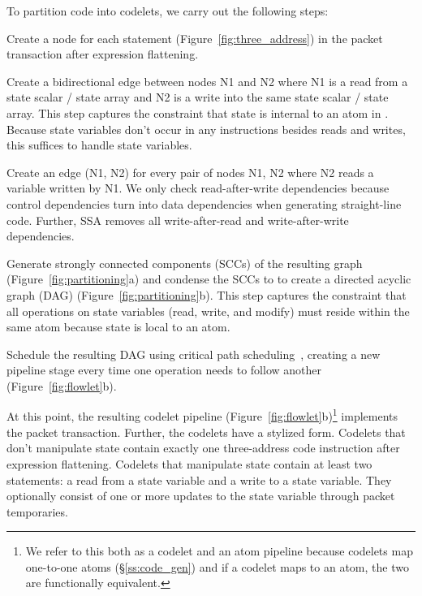 To partition code into codelets, we carry out the following steps:
\begin{CompactEnumerate}
  \item Create a node for each statement (Figure~\ref{fig:three_address}) in
    the packet transaction after expression flattening.
  \item Create a bidirectional edge between nodes N1 and N2 where N1 is a read from a
    state scalar / state array and N2 is a write into the same state scalar /
    state array. This step captures the constraint that state is internal to an
    atom in \absmachine. Because state variables don't occur in any
    instructions besides reads and writes, this suffices to handle state variables.
  \item Create an edge (N1, N2) for every pair of nodes N1, N2 where N2 reads
    a variable written by N1. We only check read-after-write dependencies because
    control dependencies turn into data dependencies when generating straight-line
    code. Further, SSA removes all write-after-read and write-after-write dependencies.
  \item Generate strongly connected components (SCCs) of the resulting graph
    (Figure~\ref{fig:partitioning}a) and condense the SCCs to to create a directed
    acyclic graph (DAG) (Figure~\ref{fig:partitioning}b). This step captures the
    constraint that all operations on state variables (read, write, and modify)
    must reside within the same atom because state is local to an atom.
  \item Schedule the resulting DAG using critical path
    scheduling~\cite{crit_path_sched}, creating a new pipeline stage every time
    one operation needs to follow another (Figure~\ref{fig:flowlet}b).
\end{CompactEnumerate}
At this point, the resulting codelet pipeline
(Figure~\ref{fig:flowlet}b)\footnote{We refer to this both as a
codelet and an atom pipeline because codelets map one-to-one atoms
(\S\ref{ss:code_gen}) and if a codelet maps to an atom, the two are
functionally equivalent.} implements the packet transaction.  Further, the codelets have a
stylized form.  Codelets that don't manipulate state contain exactly one
three-address code instruction after expression flattening. Codelets that
manipulate state contain at least two statements: a read from a state variable
and a write to a state variable.  They optionally consist of one or more
updates to the state variable through packet temporaries.

